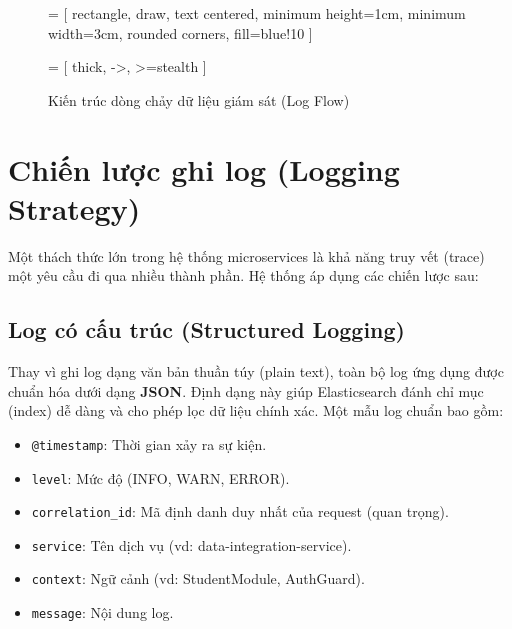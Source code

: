 \begin{figure}[h]
\centering
{} = [
    rectangle,
    draw,
    text centered,
    minimum height=1cm,
    minimum width=3cm,
    rounded corners,
    fill=blue!10
]

 = [
    thick,
    ->,
    >=stealth
]



\caption{Kiến trúc dòng chảy dữ liệu giám sát (Log Flow)}
\end{figure}

\section{Chiến lược ghi log (Logging Strategy)}

Một thách thức lớn trong hệ thống microservices là khả năng truy vết (trace) một yêu cầu đi qua nhiều thành phần. Hệ thống áp dụng các chiến lược sau:

\subsection{Log có cấu trúc (Structured Logging)}
Thay vì ghi log dạng văn bản thuần túy (plain text), toàn bộ log ứng dụng được chuẩn hóa dưới dạng \textbf{JSON}. Định dạng này giúp Elasticsearch đánh chỉ mục (index) dễ dàng và cho phép lọc dữ liệu chính xác.
Một mẫu log chuẩn bao gồm:
\begin{itemize}
    \item \texttt{@timestamp}: Thời gian xảy ra sự kiện.
    \item \texttt{level}: Mức độ (INFO, WARN, ERROR).
    \item \texttt{correlation\_id}: Mã định danh duy nhất của request (quan trọng).
    \item \texttt{service}: Tên dịch vụ (vd: data-integration-service).
    \item \texttt{context}: Ngữ cảnh (vd: StudentModule, AuthGuard).
    \item \texttt{message}: Nội dung log.
\end{itemize}


